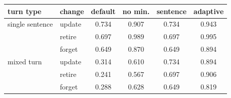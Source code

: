 \begin{tabular}{llcccc}
\toprule
turn type & change & default & no min. & sentence & adaptive \\
\midrule
single sentence & update & 0.734 & 0.907 & 0.734 & 0.943 \\
 & retire & 0.697 & 0.989 & 0.697 & 0.995 \\
 & forget & 0.649 & 0.870 & 0.649 & 0.894 \\
\addlinespace[2pt]
mixed turn & update & 0.314 & 0.610 & 0.734 & 0.894 \\
 & retire & 0.241 & 0.567 & 0.697 & 0.906 \\
 & forget & 0.288 & 0.628 & 0.649 & 0.819 \\
\bottomrule
\end{tabular}
